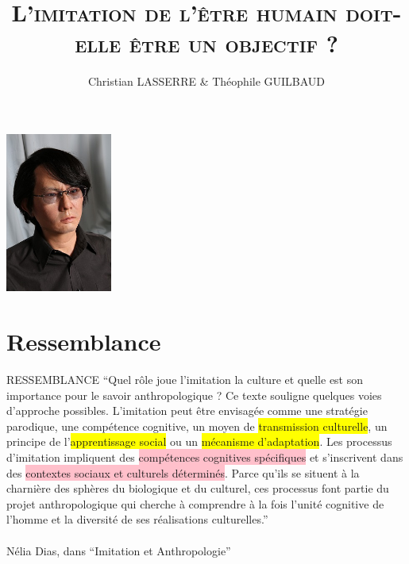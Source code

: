 \documentclass{beamer}
\title{\textsc{L'imitation de l'être humain doit-elle être un objectif ?}}
\author{Christian LASSERRE \& Théophile GUILBAUD}
\date{}
\begin{document}
\begin{frame}
  \titlepage
      {
        \vspace*{-1cm}
        \begin{center} \includegraphics[width=35mm]{data/HI-4} \end{center}
      }
\end{frame}

\begin{frame}
  \tableofcontents
\end{frame}

\section{Ressemblance}
\begin{frame}{RESSEMBLANCE}
  ``Quel rôle joue l’imitation la culture et quelle est son importance pour le savoir anthropologique ? Ce texte souligne quelques voies d’approche possibles. L’imitation peut être envisagée comme une stratégie parodique, une compétence cognitive, un moyen de \colorbox{yellow}{transmission culturelle}, un principe de l’\colorbox{yellow}{apprentissage social} ou un \colorbox{yellow}{mécanisme d’adaptation}. Les processus d’imitation impliquent des \colorbox{pink}{compétences cognitives spécifiques} et s’inscrivent dans des \colorbox{pink}{contextes sociaux et culturels déterminés}. Parce qu’ils se situent à la charnière des sphères du biologique et du culturel, ces processus font partie du projet anthropologique qui cherche à comprendre à la fois l’unité cognitive de l’homme et la diversité de ses réalisations culturelles.''
  ~\\~\\
  {\small Nélia Dias, dans ``Imitation et Anthropologie''}  
\end{frame}
\end{document}
